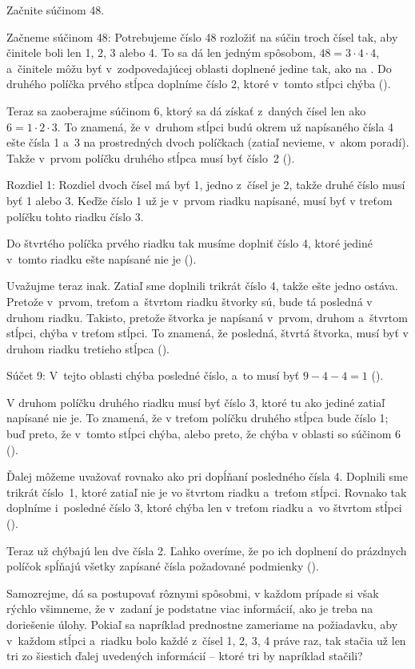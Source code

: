 {%
\napad
Začnite súčinom 48.

\riesenie
Začneme súčinom 48:
Potrebujeme číslo 48 rozložiť na súčin troch čísel tak, aby činitele boli
len 1, 2, 3 alebo 4.
To sa dá len jedným spôsobom, $48=3\cdot4\cdot4$, a~činitele môžu byť v~zodpovedajúcej oblasti doplnené jedine tak, ako na \obr.
Do druhého políčka prvého stĺpca doplníme číslo 2, ktoré v~tomto stĺpci chýba (\obr).
%


Teraz sa zaoberajme súčinom 6, ktorý sa dá získať z~daných čísel len ako
$6=1\cdot2\cdot3$.
To znamená, že v~druhom stĺpci budú okrem už napísaného čísla 4 ešte
čísla 1 a~3 na prostredných dvoch políčkach (zatiaľ nevieme, v~akom poradí).
Takže v~prvom políčku druhého stĺpca musí byť číslo~2 (\obr).
%

Rozdiel 1: Rozdiel dvoch čísel má byť 1, jedno z~čísel %
je 2, takže druhé číslo musí byť 1 alebo 3.
Keďže číslo 1 už je  v~prvom riadku napísané, musí byť v treťom políčku
tohto riadku číslo 3.

Do štvrtého políčka prvého riadku tak musíme doplniť číslo  4, ktoré jediné
v~tomto riadku ešte napísané nie je (\obr).

Uvažujme teraz inak.
Zatiaľ sme doplnili trikrát číslo 4, takže ešte jedno ostáva.
Pretože v~prvom, treťom a~štvrtom riadku štvorky sú, bude tá posledná v druhom riadku.
Takisto, pretože štvorka je napísaná  v~prvom, druhom a~štvrtom stĺpci,
chýba v treťom stĺpci.
To znamená, že posledná, štvrtá štvorka, musí byť v druhom riadku tretieho
stĺpca (\obr).
%

Súčet 9: V~tejto oblasti chýba posledné číslo, a~to musí byť $9 - 4 - 4 = 1$ (\obr).

V druhom políčku druhého riadku musí byť číslo 3, ktoré tu ako jediné zatiaľ napísané nie je.
To znamená, že v treťom políčku druhého stĺpca bude číslo  1; buď preto, že
v~tomto stĺpci chýba, alebo preto, že chýba v oblasti so súčinom 6 (\obr).
%

Ďalej môžeme uvažovať rovnako ako pri dopĺňaní posledného čísla 4.
Doplnili sme trikrát číslo~1, ktoré zatiaľ nie je vo štvrtom riadku a~treťom
stĺpci.
Rovnako tak doplníme i~posledné číslo 3, ktoré chýba len v treťom riadku a~vo štvrtom stĺpci (\obr).

Teraz už chýbajú len dve čísla 2. Ľahko overíme, že po ich doplnení do prázdnych políčok
spĺňajú všetky zapísané čísla požadované podmienky (\obr).
%

\poznamka
Samozrejme, dá sa postupovať rôznymi spôsobmi, v každom prípade si však rýchlo všimneme, že v~zadaní je podstatne viac informácií, ako je treba na doriešenie úlohy.
Pokiaľ sa napríklad prednostne zameriame na požiadavku, aby v~každom stĺpci a~riadku bolo každé z~čísel 1, 2, 3, 4 práve raz,
tak stačia už len tri zo šiestich ďalej uvedených informácií -- ktoré tri by napríklad stačili?
}

